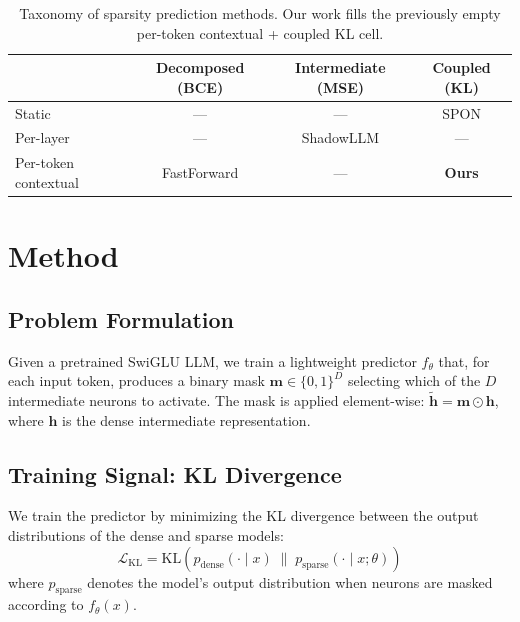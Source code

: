 \documentclass[11pt]{article}
\begin{document}
\begin{table}[t]
\centering
\caption{Taxonomy of sparsity prediction methods. Our work fills the previously empty per-token contextual + coupled KL cell.}
\label{tab:taxonomy}
\small
\begin{tabular}{lccc}
\toprule
 & Decomposed (BCE) & Intermediate (MSE) & Coupled (KL) \\
\midrule
Static & --- & --- & SPON \\
Per-layer & --- & ShadowLLM & --- \\
Per-token contextual & FastForward & --- & \textbf{Ours} \\
\bottomrule
\end{tabular}
\end{table}


\section{Method}

\subsection{Problem Formulation}

Given a pretrained SwiGLU LLM, we train a lightweight predictor $f_\theta$ that, for each input token, produces a binary mask $\mathbf{m} \in \{0,1\}^D$ selecting which of the $D$ intermediate neurons to activate. The mask is applied element-wise: $\tilde{\mathbf{h}} = \mathbf{m} \odot \mathbf{h}$, where $\mathbf{h}$ is the dense intermediate representation.

\subsection{Training Signal: KL Divergence}

We train the predictor by minimizing the KL divergence between the output distributions of the dense and sparse models:
\begin{equation}
\mathcal{L}_{\text{KL}} = \text{KL}\!\left(p_{\text{dense}}(\cdot \mid x) \;\|\; p_{\text{sparse}}(\cdot \mid x; \theta)\right)
\end{equation}
where $p_{\text{sparse}}$ denotes the model's output distribution when neurons are masked according to $f_\theta(x)$.
\end{document}
